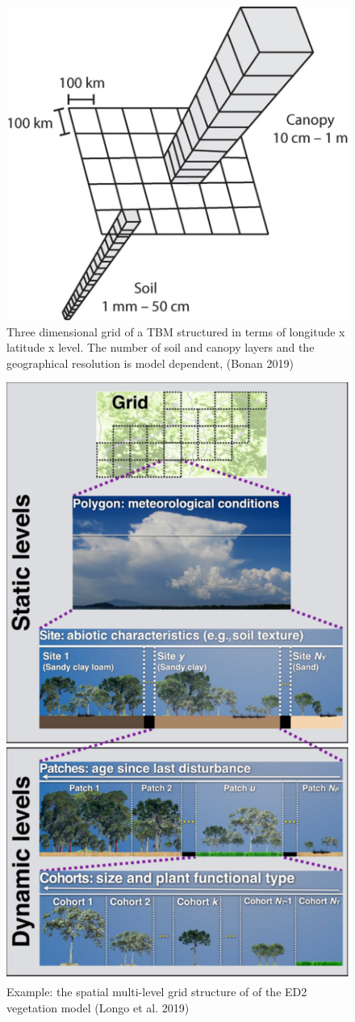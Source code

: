 \documentclass[
  12pt,
  oneside]{book}
\begin{document}
\begin{figure}

{\centering \includegraphics[width=0.5\linewidth]{figures/chap1/grid_vert_hor} 

}

\caption{Three dimensional grid of a TBM structured in terms of longitude x latitude x level. The number of soil and canopy layers and the geographical resolution is model dependent, (Bonan 2019)}\label{fig:f10}
\end{figure}

\begin{figure}

{\centering \includegraphics[width=0.7\linewidth]{figures/chap1/grid_ED2} 

}

\caption{Example: the spatial multi-level grid structure of of the ED2 vegetation model (Longo et al. 2019)}\label{fig:f11}
\end{figure}
\end{document}
